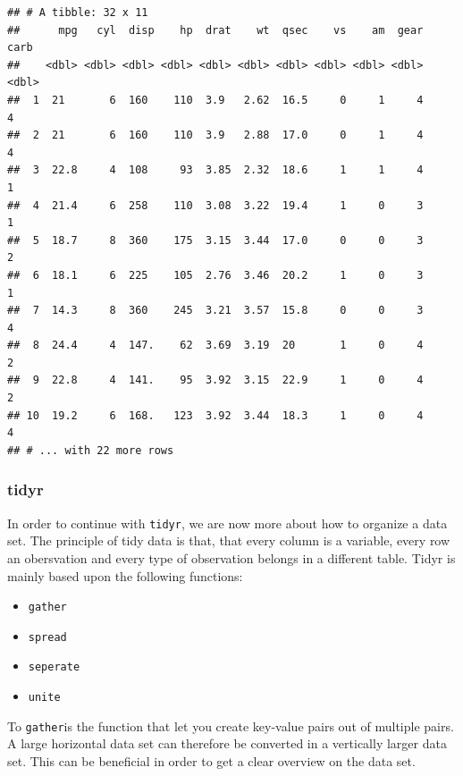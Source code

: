 \documentclass[]{report}
\providecommand{\tightlist}{%
  \setlength{\itemsep}{0pt}\setlength{\parskip}{0pt}}
\begin{document}
\begin{verbatim}
## # A tibble: 32 x 11
##      mpg   cyl  disp    hp  drat    wt  qsec    vs    am  gear  carb
##    <dbl> <dbl> <dbl> <dbl> <dbl> <dbl> <dbl> <dbl> <dbl> <dbl> <dbl>
##  1  21       6  160    110  3.9   2.62  16.5     0     1     4     4
##  2  21       6  160    110  3.9   2.88  17.0     0     1     4     4
##  3  22.8     4  108     93  3.85  2.32  18.6     1     1     4     1
##  4  21.4     6  258    110  3.08  3.22  19.4     1     0     3     1
##  5  18.7     8  360    175  3.15  3.44  17.0     0     0     3     2
##  6  18.1     6  225    105  2.76  3.46  20.2     1     0     3     1
##  7  14.3     8  360    245  3.21  3.57  15.8     0     0     3     4
##  8  24.4     4  147.    62  3.69  3.19  20       1     0     4     2
##  9  22.8     4  141.    95  3.92  3.15  22.9     1     0     4     2
## 10  19.2     6  168.   123  3.92  3.44  18.3     1     0     4     4
## # ... with 22 more rows
\end{verbatim}

\subsubsection{tidyr}\label{tidyr}

In order to continue with \texttt{tidyr}, we are now more about how to
organize a data set. The principle of tidy data is that, that every
column is a variable, every row an obersvation and every type of
observation belongs in a different table. Tidyr is mainly based upon the
following functions:

\begin{itemize}
\tightlist
\item
  \texttt{gather}
\item
  \texttt{spread}
\item
  \texttt{seperate}
\item
  \texttt{unite}
\end{itemize}

To \texttt{gather}is the function that let you create key-value pairs
out of multiple pairs. A large horizontal data set can therefore be
converted in a vertically larger data set. This can be beneficial in
order to get a clear overview on the data set.
\end{document}
